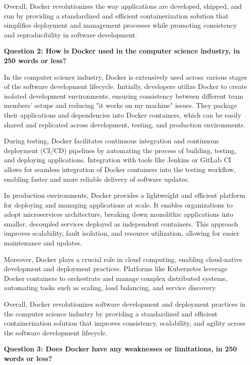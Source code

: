 \documentclass[a4paper, 11pt]{report}
\begin{document}
Overall, Docker revolutionizes the way applications are developed, shipped, and run by providing a standardized and efficient containerization solution that simplifies deployment and management processes while promoting consistency and reproducibility in software development. 

 \vspace{\baselineskip}
\textbf{Question 2: How is Docker used in the computer science industry, in 250 words or less?}

In the computer science industry, Docker is extensively used across various stages of the software development lifecycle. Initially, developers utilize Docker to create isolated development environments, ensuring consistency between different team members' setups and reducing "it works on my machine" issues. They package their applications and dependencies into Docker containers, which can be easily shared and replicated across development, testing, and production environments. 

During testing, Docker facilitates continuous integration and continuous deployment (CI/CD) pipelines by automating the process of building, testing, and deploying applications. Integration with tools like Jenkins or GitLab CI allows for seamless integration of Docker containers into the testing workflow, enabling faster and more reliable delivery of software updates. 

In production environments, Docker provides a lightweight and efficient platform for deploying and managing applications at scale. It enables organizations to adopt microservices architecture, breaking down monolithic applications into smaller, decoupled services deployed as independent containers. This approach improves scalability, fault isolation, and resource utilization, allowing for easier maintenance and updates. 

Moreover, Docker plays a crucial role in cloud computing, enabling cloud-native development and deployment practices. Platforms like Kubernetes leverage Docker containers to orchestrate and manage complex distributed systems, automating tasks such as scaling, load balancing, and service discovery. 

Overall, Docker revolutionizes software development and deployment practices in the computer science industry by providing a standardized and efficient containerization solution that improves consistency, scalability, and agility across the software development lifecycle. 

\vspace{\baselineskip}
\textbf{Question 3: Does Docker have any weaknesses or limitations, in 250 words or less?}
\end{document}

